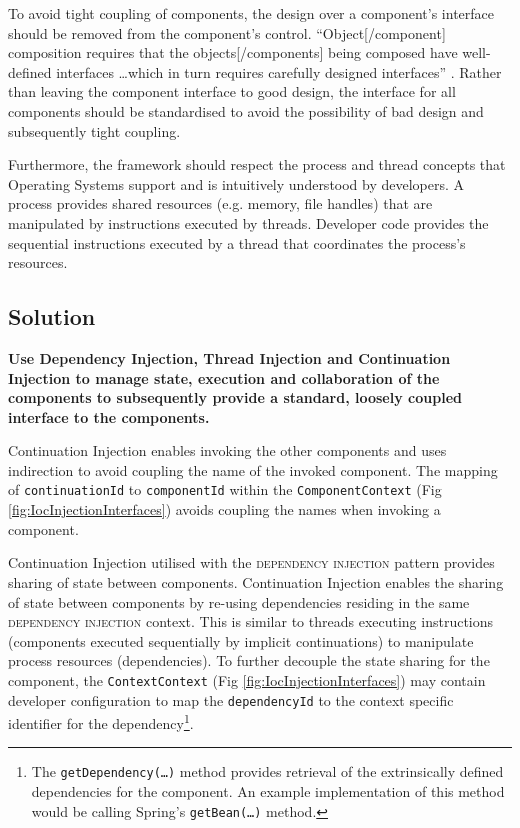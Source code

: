 \documentclass[prodmode]{style/acmlarge}
\begin{document}
To avoid tight coupling of components, the design over a component's
interface should be removed from the component's control. ``Object[/component]
composition requires that the objects[/components] being composed have
well-defined interfaces \ldots which in turn requires carefully designed
interfaces'' \cite[p. 19]{gof}.  Rather than leaving the component interface to
good design, the interface for all components should be standardised to avoid
the possibility of bad design and subsequently tight coupling.

Furthermore, the framework should respect the process and thread concepts that
Operating Systems support and is intuitively understood by developers.  A
process provides shared resources (e.g. memory, file handles) that are
manipulated by instructions executed by threads.  Developer code provides the
sequential instructions executed by a thread that coordinates the process's
resources.


\subsection{Solution}

\textbf{Use Dependency Injection, Thread Injection and Continuation Injection to manage state, execution and collaboration of the components to subsequently provide a standard, loosely coupled interface to the components.}

Continuation Injection enables invoking the other components and uses
indirection to avoid coupling the name of the invoked component.  The mapping of
\texttt{continuationId} to \texttt{componentId} within the
\texttt{ComponentContext} (Fig \ref{fig:IocInjectionInterfaces}) avoids
coupling the names when invoking a component.

Continuation Injection utilised with the \textsc{dependency injection} pattern
\cite{ioc} provides sharing of state between components.  Continuation Injection
enables the sharing of state between components by re-using dependencies
residing in the same \textsc{dependency injection} context.  This is similar to
threads executing instructions (components executed sequentially by implicit
continuations) to manipulate process resources (dependencies).  To further
decouple the state sharing for the component, the \texttt{ContextContext} (Fig
\ref{fig:IocInjectionInterfaces}) may contain developer configuration to map the
\texttt{dependencyId} to the context specific identifier for the
dependency\footnote{The \texttt{getDependency(\ldots)} method provides retrieval
of the extrinsically defined dependencies for the component.  An example
implementation of this method would be calling Spring's \cite{spring}
\texttt{getBean(\ldots)} method.}.
\end{document}
